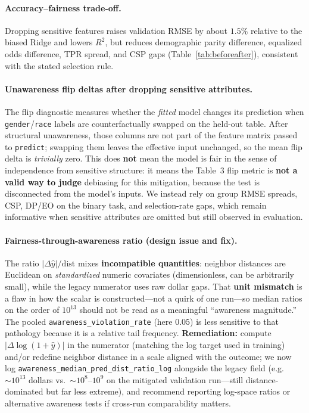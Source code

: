 \documentclass[sigconf,nonacm]{acmart}
\begin{document}
\paragraph{Accuracy--fairness trade-off.}
Dropping sensitive features raises validation RMSE by about $1.5\%$ relative to the biased Ridge and lowers $R^2$, but reduces demographic parity difference, equalized odds difference, TPR spread, and CSP gaps (Table~\ref{tab:beforeafter}), consistent with the stated selection rule.

\paragraph{Unawareness flip deltas after dropping sensitive attributes.}
The flip diagnostic measures whether the \emph{fitted} model changes its prediction when \texttt{gender}/\texttt{race} labels are counterfactually swapped on the held-out table.
After structural unawareness, those columns are not part of the feature matrix passed to \texttt{predict}; swapping them leaves the effective input unchanged, so the mean flip delta is \emph{trivially} zero.
This does \textbf{not} mean the model is fair in the sense of independence from sensitive structure: it means the Table~3 flip metric is \textbf{not a valid way to judge} debiasing for this mitigation, because the test is disconnected from the model's inputs.
We instead rely on group RMSE spreads, CSP, DP/EO on the binary task, and selection-rate gaps, which remain informative when sensitive attributes are omitted but still observed in evaluation.

\paragraph{Fairness-through-awareness ratio (design issue and fix).}
The ratio $|\Delta\hat y|/\mathrm{dist}$ mixes \textbf{incompatible quantities}: neighbor distances are Euclidean on \emph{standardized} numeric covariates (dimensionless, can be arbitrarily small), while the legacy numerator uses raw dollar gaps.
That \textbf{unit mismatch} is a flaw in how the scalar is constructed---not a quirk of one run---so median ratios on the order of $10^{13}$ should not be read as a meaningful ``awareness magnitude.''
The pooled \texttt{awareness\_violation\_rate} (here $0.05$) is less sensitive to that pathology because it is a relative tail frequency.
\textbf{Remediation:} compute $|\Delta\log(1{+}\hat y)|$ in the numerator (matching the log target used in training) and/or redefine neighbor distance in a scale aligned with the outcome; we now log \texttt{awareness\_median\_pred\_dist\_ratio\_log} alongside the legacy field (e.g.\ $\sim 10^{13}$ dollars vs.\ $\sim 10^{8}$--$10^{9}$ on the mitigated validation run---still distance-dominated but far less extreme), and recommend reporting log-space ratios or alternative awareness tests if cross-run comparability matters.
\end{document}
